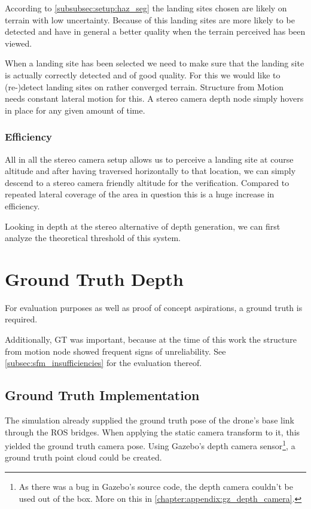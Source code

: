 According to \cref{subsubsec:setup:haz_seg} the landing sites chosen are likely on terrain with low uncertainty. Because of this landing sites are more likely to be detected and have in general a better quality when the terrain perceived has been viewed.

When a landing site has been selected we need to make sure that the landing site is actually correctly detected and of good quality. For this we would like to (re-)detect landing sites on rather converged terrain. Structure from Motion needs constant lateral motion for this. A stereo camera depth node simply hovers in place for any given amount of time.

\subsubsection{Efficiency}

All in all the stereo camera setup allows us to perceive a landing site at course altitude and after having traversed horizontally to that location, we can simply descend to a stereo camera friendly altitude for the verification. Compared to repeated lateral coverage of the area in question this is a huge increase in efficiency.

Looking in depth at the stereo alternative of depth generation, we can first analyze the theoretical threshold of this system.

\section{Ground Truth Depth}

For evaluation purposes as well as proof of concept aspirations, a ground truth is required. 

Additionally, GT was important, because at the time of this work the structure from motion node showed frequent signs of unreliability. See \cref{subsec:sfm_insufficiencies} for the evaluation thereof.

\subsection{Ground Truth Implementation}
The simulation already supplied the ground truth pose of the drone's base link through the ROS bridges. When applying the static camera transform to it, this yielded the ground truth camera pose. Using Gazebo's depth camera sensor\footnote[1]{As there was a bug in Gazebo's source code, the depth camera couldn't be used out of the box. More on this in \cref{chapter:appendix:gz_depth_camera}.}, a ground truth point cloud could be created.

